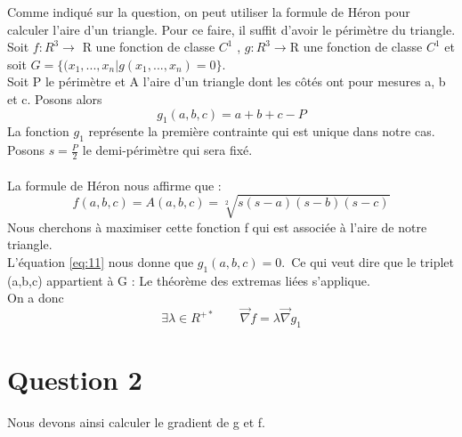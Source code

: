 \documentclass[12pt]{report}
\begin{document}
Comme indiqué sur la question, on peut utiliser la formule de Héron pour calculer l'aire d'un triangle.
Pour ce faire, il suffit d'avoir le périmètre du triangle.\\
\indent Soit $f:R^{3}\longrightarrow$ R une fonction de classe $C^{1}$ , $g:R^{3}\longrightarrow$R une fonction de classe
$C^{1}$ et soit $ G = \lbrace (x_{1},...,x_{n}\vert g(x_{1},...,x_{n})=0\rbrace.$\\
\indent Soit P le périmètre et A l'aire d'un triangle dont les côtés ont pour mesures a, b et c. Posons alors\\
\begin{equation}\label{eq:11}
   g_{1}(a,b,c) = a + b + c - P
\end{equation}
La fonction $g_{1}$ représente la première contrainte qui est unique dans notre cas.\\
Posons $s = \frac{P}{2}$ le demi-périmètre qui sera fixé.\\ \\
La formule de Héron nous affirme que :
\begin{equation}
   f(a,b,c) = A(a,b,c) = \sqrt[2]{s(s-a)(s-b)(s-c)}
\end{equation}
Nous cherchons à maximiser cette fonction f qui est associée à l'aire de notre triangle.\\
\indent L'équation \eqref{eq:11} nous donne que $g_{1}(a,b,c) = 0$.\ Ce qui veut dire que le triplet (a,b,c) appartient à G : Le théorème des extremas liées s'applique.\\
On a donc 
\begin{equation}\label{eq:13}
   \exists\lambda\in R^{+*} \quad \quad \overrightarrow{\nabla}f = \lambda \overrightarrow{\nabla}g_{1}
\end{equation}

\clearpage
\section{Question 2}
Nous devons ainsi calculer le gradient de g et f.
\end{document}
